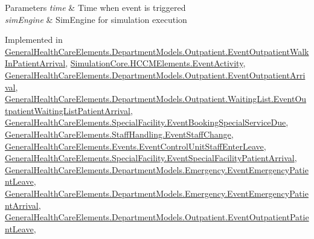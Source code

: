 \begin{DoxyParams}{Parameters}
{\em time} & Time when event is triggered\\
\hline
{\em sim\+Engine} & Sim\+Engine for simulation execution\\
\hline
\end{DoxyParams}


Implemented in \hyperlink{class_general_health_care_elements_1_1_department_models_1_1_outpatient_1_1_event_outpatient_walk_in_patient_arrival_a7d1d5b3757f59f470523eed185a87b5c}{General\+Health\+Care\+Elements.\+Department\+Models.\+Outpatient.\+Event\+Outpatient\+Walk\+In\+Patient\+Arrival}, \hyperlink{class_simulation_core_1_1_h_c_c_m_elements_1_1_event_activity_acfeccc7e94cc223258a4e611eeb0d703}{Simulation\+Core.\+H\+C\+C\+M\+Elements.\+Event\+Activity}, \hyperlink{class_general_health_care_elements_1_1_department_models_1_1_outpatient_1_1_event_outpatient_arrival_a5e187135f06879dab2d048b41e5831a4}{General\+Health\+Care\+Elements.\+Department\+Models.\+Outpatient.\+Event\+Outpatient\+Arrival}, \hyperlink{class_general_health_care_elements_1_1_department_models_1_1_outpatient_1_1_waiting_list_1_1_eveb69cba3dbb99690008a282b7e42002d2_ae40affb64afb616011a473742e921987}{General\+Health\+Care\+Elements.\+Department\+Models.\+Outpatient.\+Waiting\+List.\+Event\+Outpatient\+Waiting\+List\+Patient\+Arrival}, \hyperlink{class_general_health_care_elements_1_1_special_facility_1_1_event_booking_special_service_due_affbc6c7e996ee7b973d1fd40458fc04f}{General\+Health\+Care\+Elements.\+Special\+Facility.\+Event\+Booking\+Special\+Service\+Due}, \hyperlink{class_general_health_care_elements_1_1_staff_handling_1_1_event_staff_change_a130cee538c64cdd33a950881159fab25}{General\+Health\+Care\+Elements.\+Staff\+Handling.\+Event\+Staff\+Change}, \hyperlink{class_general_health_care_elements_1_1_events_1_1_event_control_unit_staff_enter_leave_aef4d568a855094fc81c6103b310173de}{General\+Health\+Care\+Elements.\+Events.\+Event\+Control\+Unit\+Staff\+Enter\+Leave}, \hyperlink{class_general_health_care_elements_1_1_special_facility_1_1_event_special_facility_patient_arrival_ae84fc28293ac8876d176cb5e9389229d}{General\+Health\+Care\+Elements.\+Special\+Facility.\+Event\+Special\+Facility\+Patient\+Arrival}, \hyperlink{class_general_health_care_elements_1_1_department_models_1_1_emergency_1_1_event_emergency_patient_leave_a19c2ab25ce18f640615600c8486f4376}{General\+Health\+Care\+Elements.\+Department\+Models.\+Emergency.\+Event\+Emergency\+Patient\+Leave}, \hyperlink{class_general_health_care_elements_1_1_department_models_1_1_emergency_1_1_event_emergency_patient_arrival_aed4d2c00f77aabfd24880d44c004450e}{General\+Health\+Care\+Elements.\+Department\+Models.\+Emergency.\+Event\+Emergency\+Patient\+Arrival}, \hyperlink{class_general_health_care_elements_1_1_department_models_1_1_outpatient_1_1_event_outpatient_patient_leave_a52a87c518ca8aa8b755fda556462b8d6}{General\+Health\+Care\+Elements.\+Department\+Models.\+Outpatient.\+Event\+Outpatient\+Patient\+Leave}, 
